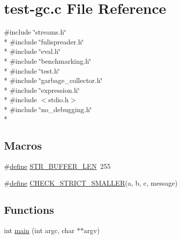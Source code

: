 \hypertarget{test-gc_8c}{\section{test-\/gc.c File Reference}
\label{test-gc_8c}
}
{\ttfamily \#include \char`\"{}streams.\+h\char`\"{}}\\*
{\ttfamily \#include \char`\"{}fulispreader.\+h\char`\"{}}\\*
{\ttfamily \#include \char`\"{}eval.\+h\char`\"{}}\\*
{\ttfamily \#include \char`\"{}benchmarking.\+h\char`\"{}}\\*
{\ttfamily \#include \char`\"{}test.\+h\char`\"{}}\\*
{\ttfamily \#include \char`\"{}garbage\+\_\+collector.\+h\char`\"{}}\\*
{\ttfamily \#include \char`\"{}expression.\+h\char`\"{}}\\*
{\ttfamily \#include $<$stdio.\+h$>$}\\*
{\ttfamily \#include \char`\"{}no\+\_\+debugging.\+h\char`\"{}}\\*
\subsection*{Macros}
\begin{DoxyCompactItemize}
\item 
\#\hyperlink{nativefunctions_8h_a06f28a72fd48e4a07d1d9e541bad304a}{define} \hyperlink{test-gc_8c_aaba93a4db475db0253cf8e1ce05151cd}{S\+T\+R\+\_\+\+B\+U\+F\+F\+E\+R\+\_\+\+L\+E\+N}~255
\item 
\#\hyperlink{nativefunctions_8h_a06f28a72fd48e4a07d1d9e541bad304a}{define} \hyperlink{test-gc_8c_a4dabf563a9ae05ca715ea6a4598e4919}{C\+H\+E\+C\+K\+\_\+\+S\+T\+R\+I\+C\+T\+\_\+\+S\+M\+A\+L\+L\+E\+R}(a, b, c, message)
\end{DoxyCompactItemize}
\subsection*{Functions}
\begin{DoxyCompactItemize}
\item 
int \hyperlink{test-gc_8c_a3c04138a5bfe5d72780bb7e82a18e627}{main} (int argc, char $\ast$$\ast$argv)
\end{DoxyCompactItemize}



